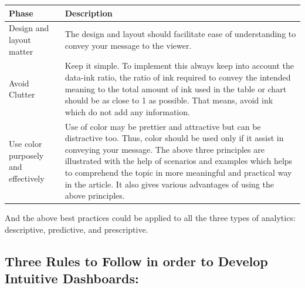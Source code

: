\documentclass[]{book}
\theoremstyle{definition}
\theoremstyle{definition}
\theoremstyle{definition}
\theoremstyle{remark}
\begin{document}
\begin{longtable}[]{@{}ll@{}}
\toprule
\begin{minipage}[b]{0.16\columnwidth}\raggedright\strut
\textbf{Phase}\strut
\end{minipage} & \begin{minipage}[b]{0.78\columnwidth}\raggedright\strut
\textbf{Description}\strut
\end{minipage}\tabularnewline
\midrule
\endhead
\begin{minipage}[t]{0.16\columnwidth}\raggedright\strut
Design and layout matter\strut
\end{minipage} & \begin{minipage}[t]{0.78\columnwidth}\raggedright\strut
The design and layout should facilitate ease of understanding to convey
your message to the viewer.\strut
\end{minipage}\tabularnewline
\begin{minipage}[t]{0.16\columnwidth}\raggedright\strut
Avoid Clutter\strut
\end{minipage} & \begin{minipage}[t]{0.78\columnwidth}\raggedright\strut
Keep it simple. To implement this always keep into account the data-ink
ratio, the ratio of ink required to convey the intended meaning to the
total amount of ink used in the table or chart should be as close to 1
as possible. That means, avoid ink which do not add any
information.\strut
\end{minipage}\tabularnewline
\begin{minipage}[t]{0.16\columnwidth}\raggedright\strut
Use color purposely and effectively\strut
\end{minipage} & \begin{minipage}[t]{0.78\columnwidth}\raggedright\strut
Use of color may be prettier and attractive but can be distractive too.
Thus, color should be used only if it assist in conveying your message.
The above three principles are illustrated with the help of scenarios
and examples which helps to comprehend the topic in more meaningful and
practical way in the article. It also gives various advantages of using
the above principles.\strut
\end{minipage}\tabularnewline
\bottomrule
\end{longtable}

And the above best practices could be applied to all the three types of
analytics: descriptive, predictive, and prescriptive.

\subsection{Three Rules to Follow in order to Develop Intuitive
Dashboards:}\label{three-rules-to-follow-in-order-to-develop-intuitive-dashboards}
\end{document}
